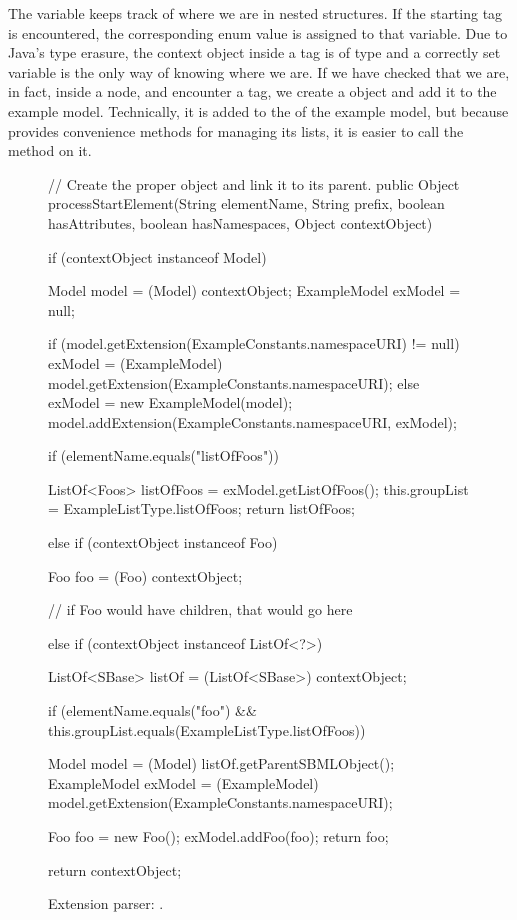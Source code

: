 The  variable keeps track of where we are in
nested structures.  If the  starting tag is encountered,
the corresponding enum value is assigned to that variable.  Due to Java's
type erasure, the context object inside a  tag is of type
 and a correctly set  variable is the only
way of knowing where we are.  If we have checked that we are, in fact,
inside a  node, and encounter a  tag, we create a
 object and add it to the example model.  Technically, it is
added to the  of the example model, but because
 provides convenience methods for managing its lists, it
is easier to call the  method on it.

\begin{figure}[tb]
  \begin{example}[numbers=left]
// Create the proper object and link it to its parent.
public Object processStartElement(String elementName, String prefix,
    boolean hasAttributes, boolean hasNamespaces, Object contextObject) {

  if (contextObject instanceof Model) {
    Model model = (Model) contextObject;
    ExampleModel exModel = null;

    if (model.getExtension(ExampleConstants.namespaceURI) != null) {
      exModel = (ExampleModel) model.getExtension(ExampleConstants.namespaceURI);
    } else {
      exModel = new ExampleModel(model);
      model.addExtension(ExampleConstants.namespaceURI, exModel);
    }

    if (elementName.equals("listOfFoos")) {

      ListOf<Foos> listOfFoos = exModel.getListOfFoos();
      this.groupList = ExampleListType.listOfFoos;
      return listOfFoos;
    }
  } else if (contextObject instanceof Foo) {
    Foo foo = (Foo) contextObject;

    // if Foo would have children, that would go here

  }
  else if (contextObject instanceof ListOf<?>) {
    ListOf<SBase> listOf = (ListOf<SBase>) contextObject;

    if (elementName.equals("foo") && this.groupList.equals(ExampleListType.listOfFoos)) {
      Model model = (Model) listOf.getParentSBMLObject();
      ExampleModel exModel = (ExampleModel) model.getExtension(ExampleConstants.namespaceURI);

      Foo foo = new Foo();
      exModel.addFoo(foo);
      return foo;
    }
  }
  return contextObject;
}\end{example}
  \caption{Extension parser: .}
  \label{lst:ModelExtParserStartElement}
\end{figure}


